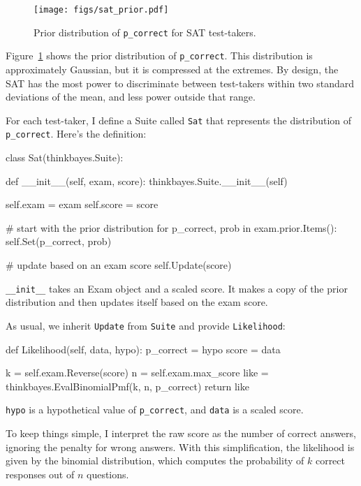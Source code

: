 \documentclass[12pt]{book}
\theoremstyle{exercise}
\begin{document}
\begin{figure}
\centerline{\texttt{[image: figs/sat\_prior.pdf]}}
\caption{Prior distribution of {\tt p\_correct} for SAT test-takers.}
\label{fig.satprior}
\end{figure}

Figure~\ref{fig.satprior} shows the prior distribution of
\verb"p_correct".  This distribution is approximately Gaussian, but it
is compressed at the extremes.  By design, the SAT has the most power
to discriminate between test-takers within two standard deviations of
the mean, and less power outside that range.

For each test-taker, I define a Suite called {\tt Sat} that
represents the distribution of \verb"p_correct".  Here's the definition:

\begin{code}
class Sat(thinkbayes.Suite):

    def __init__(self, exam, score):
        thinkbayes.Suite.__init__(self)

        self.exam = exam
        self.score = score

        # start with the prior distribution
        for p_correct, prob in exam.prior.Items():
            self.Set(p_correct, prob)

        # update based on an exam score
        self.Update(score)
\end{code}

\verb"__init__" takes an Exam object and a scaled score.  It makes a
copy of the prior distribution and then updates itself based on the
exam score.

As usual, we inherit {\tt Update} from {\tt Suite} and provide
{\tt Likelihood}:

\begin{code}
    def Likelihood(self, data, hypo):
        p_correct = hypo
        score = data

        k = self.exam.Reverse(score)
        n = self.exam.max_score
        like = thinkbayes.EvalBinomialPmf(k, n, p_correct)
        return like
\end{code}

{\tt hypo} is a hypothetical
value of \verb"p_correct", and {\tt data} is a scaled score.

To keep things simple, I interpret the raw score as the number of
correct answers, ignoring the penalty for wrong answers.  With
this simplification, the likelihood is given by the binomial
distribution, which computes the probability of $k$ correct
responses out of $n$ questions.
\end{document}
